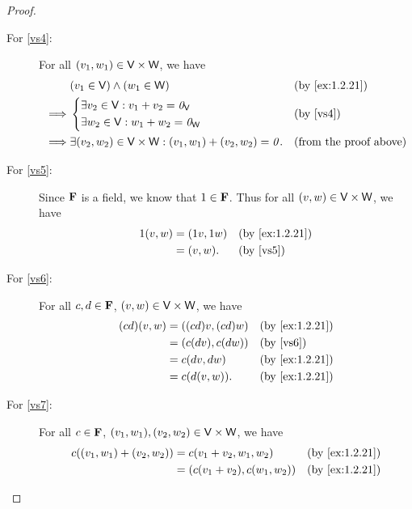 \begin{proof}
\begin{description}
    \item[For \ref{vs4}:]
      For all \(\left\lparen v_{1}, w_{1}\right\rparen \in \mathsf{V} \times \mathsf{W}\), we have
      \begin{align*}
                 & \p{v_{1} \in \V} \land \p{w_{1} \in \W}                                                &  & \text{(by \cref{ex:1.2.21})}  \\
        \implies & \begin{dcases}
          \exists v_{2} \in \V : v_{1} + v_{2} = \zv_{\V} \\
          \exists w_{2} \in \V : w_{1} + w_{2} = \zv_{\W}
        \end{dcases}                                                             &  & \text{(by \ref{vs4})}         \\
        \implies & \exists \p{v_{2}, w_{2}} \in \V \times \W : \p{v_{1}, w_{1}} + \p{v_{2}, w_{2}} = \zv. &  & \text{(from the proof above)}
      \end{align*}
    \item[For \ref{vs5}:]
      Since \(\mathbf{F}\) is a field, we know that \(1 \in \mathbf{F}\).
      Thus for all \(\left\lparen v, w\right\rparen \in \mathsf{V} \times \mathsf{W}\), we have
      \begin{align*}
        1\p{v, w} & = \p{1v, 1w} &  & \text{(by \cref{ex:1.2.21})} \\
                  & = \p{v, w}.  &  & \text{(by \ref{vs5})}
      \end{align*}
    \item[For \ref{vs6}:]
      For all \(c, d \in \mathbf{F}\), \(\left\lparen v, w\right\rparen \in \mathsf{V} \times \mathsf{W}\), we have
      \begin{align*}
        \p{cd} \p{v, w} & = \p{\p{cd} v, \p{cd} w} &  & \text{(by \cref{ex:1.2.21})} \\
                        & = \p{c\p{dv}, c\p{dw}}   &  & \text{(by \ref{vs6})}        \\
                        & = c \p{dv, dw}           &  & \text{(by \cref{ex:1.2.21})} \\
                        & = c\p{d\p{v, w}}.        &  & \text{(by \cref{ex:1.2.21})}
      \end{align*}
    \item[For \ref{vs7}:]
      For all \(c \in \mathbf{F}\), \(\p{v_{1}, w_{1}}, \p{v_{2}, w_{2}} \in \V \times \W\), we have
      \begin{align*}
        c \p{\p{v_{1}, w_{1}} + \p{v_{2}, w_{2}}} & = c \p{v_{1} + v_{2}, w_{1}, w_{2}}         &  & \text{(by \cref{ex:1.2.21})} \\
                                                  & = \p{c\p{v_{1} + v_{2}}, c\p{w_{1}, w_{2}}} &  & \text{(by \cref{ex:1.2.21})} \\

\end{align*}
\end{description}
\end{proof}
